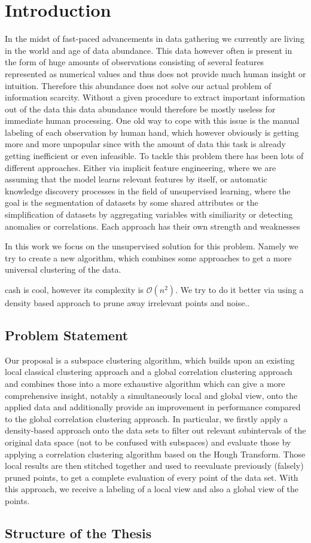 \chapter{Introduction}

In the midst of fast-paced advancements in data gathering we currently are living in the world and age of data abundance. This data however often is present in the form of huge amounts of observations consisting of several features represented as numerical values and thus does not provide much human insight or intuition. Therefore this abundance does not solve our actual problem of information scarcity. Without a given procedure to extract important information out of the data this data abundance would therefore be mostly useless for immediate human processing. One old way to cope with this issue is the manual labeling of each observation by human hand, which however obviously is getting more and more unpopular since with the amount of data this task is already getting inefficient or even infeasible. %
To tackle this problem there has been lots of different approaches. Either via implicit feature engineering, where we are assuming that the model learns relevant features by itself, or automatic knowledge discovery processes in the field of unsupervised learning, where the goal is  the segmentation of datasets by some shared attributes or the simplification of datasets by aggregating variables with similiarity or detecting anomalies or correlations. Each approach has their own strength and weaknesses

In this work we focus on the unsupervised solution for this problem. Namely we try to create a new algorithm, which combines some approaches to get a more universal clustering of the data.

\acrfull{cash} is cool, however its complexity is $\mathcal{O}(n^2)$.
We try to do it better via using a density based approach to prune away irrelevant points and noise..

\section{Problem Statement}
Our proposal is a subspace clustering algorithm, which builds upon an existing local classical clustering approach and a global correlation clustering approach and combines those into a more exhaustive algorithm which can give a more comprehensive insight, notably a simultaneously local and global view, onto the applied data and additionally provide an improvement in performance compared to the global correlation clustering approach. In particular, we firstly apply a density-based approach onto the data sets to filter out relevant subintervals of the original data space (not to be confused with subspaces) and evaluate those by applying a correlation clustering algorithm based on the Hough Transform. Those local results are then stitched together and used to reevaluate previously (falsely) pruned points, to get a complete evaluation of every point of the data set. With this approach, we receive a labeling of a local view and also a global view of the points. 

\section{Structure of the Thesis}
